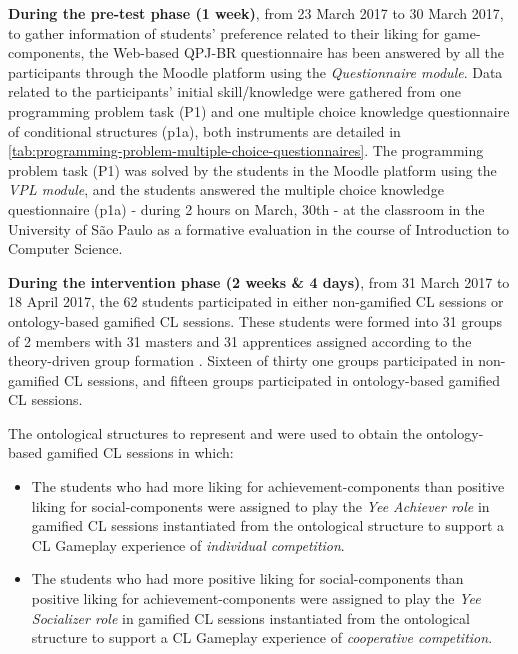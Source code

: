 \textbf{During the pre-test phase (1 week)}, from 23 March 2017 to 30 March 2017, to gather information of students' preference related to their liking for game-components, the Web-based QPJ-BR questionnaire has been answered by all the participants through the Moodle platform using the \emph{Questionnaire module}. Data related to the participants' initial skill/knowledge were gathered from one programming problem task (P1) and one multiple choice knowledge questionnaire of conditional structures (p1a), both instruments are detailed in \autoref{tab:programming-problem-multiple-choice-questionnaires}. The programming problem task (P1) was solved by the students in the Moodle platform using the \emph{VPL module}, and the students answered the multiple choice knowledge questionnaire (p1a) - during 2 hours on March, 30th - at the classroom in the University of São Paulo as a formative evaluation in the course of Introduction to Computer Science. 

\textbf{During the intervention phase (2 weeks \& 4 days)}, from 31 March 2017 to 18 April 2017, the 62 students participated in either non-gamified CL sessions or ontology-based gamified CL sessions. These students were formed into 31 groups of 2 members with 31 masters and 31 apprentices assigned according to the theory-driven group formation \cite{IsotaniMizoguchi2008a}. Sixteen of thirty one groups participated in non-gamified CL sessions, and fifteen groups participated in ontology-based gamified CL sessions.

The ontological structures to represent  and  were used to obtain the ontology-based gamified CL sessions in which:
\begin{itemize}
\item The students who had more liking for achievement-components than positive liking for social-components were assigned to play the \emph{Yee Achiever role} in gamified CL sessions instantiated from the ontological structure  to support a CL Gameplay experience of \emph{individual competition}.
\item The students who had more positive liking for social-components than positive liking for achievement-components were assigned to play the \emph{Yee Socializer role} in gamified CL sessions instantiated from the ontological structure  to support a CL Gameplay experience of \emph{cooperative competition}.
\end{itemize}

